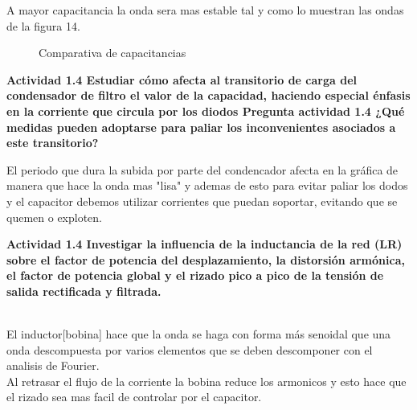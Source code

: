 \documentclass[letterpaper]{article}
\begin{document}
A mayor capacitancia la onda sera mas estable tal y como lo muestran las ondas de la figura 14.\newpage
\begin{figure}[htb]
    \centering
    \caption{Comparativa de capacitancias}
    \label{fig:my_labeel}
\end{figure}
 \begin{large}

\textbf{Actividad 1.4 Estudiar cómo afecta al transitorio de carga del condensador
de filtro el valor de la capacidad, haciendo especial énfasis en la
corriente que circula por los diodos Pregunta actividad 1.4 ¿Qué medidas
pueden adoptarse para paliar los inconvenientes asociados a este transitorio?}\end{large}

\begin{large}
El periodo que dura la subida por parte del condencador afecta en la gráfica de manera que hace la onda mas "lisa" y ademas de esto para evitar paliar los dodos y el capacitor debemos utilizar corrientes que puedan soportar, evitando que se quemen o exploten.

\textbf{Actividad 1.4 Investigar la influencia de la inductancia de la red
(LR) sobre el factor de potencia del desplazamiento, la distorsión
armónica, el factor de potencia global y el rizado pico a pico de
la tensión de salida rectificada y filtrada.}\end{large}\\
El inductor[bobina] hace que la onda se haga con forma más senoidal que una onda descompuesta por varios elementos que se deben descomponer con el analisis de Fourier.\\
Al retrasar el flujo de la corriente la bobina reduce los armonicos y esto hace que el rizado sea mas facil de controlar por el capacitor.
\end{document}
